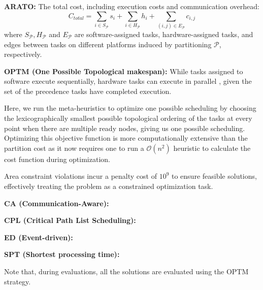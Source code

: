 \textbf{ARATO:} The total cost, including execution costs and communication overhead:
\begin{equation}
C_{total} = \sum_{i \in S_{\mathcal{P}}} s_i + \sum_{i \in H_{\mathcal{P}}} h_i + \sum_{(i,j) \in E_{\mathcal{P}}} c_{i,j}
\end{equation}
where $S_{\mathcal{P}}, H_{\mathcal{P}}$ and $E_{\mathcal{P}}$ are software-assigned tasks, hardware-assigned tasks, and edges between tasks on different platforms induced by partitioning $\mathcal{P}$, respectively.


\textbf{OPTM (One Possible Topological makespan):} While tasks assigned to software execute sequentially, hardware tasks can execute in parallel , given the set of the precedence tasks have completed execution.


Here, we run the meta-heuristics to optimize one possible scheduling by choosing the lexicographically smallest possible topological ordering of the tasks at every point when there are multiple ready nodes, giving us one possible scheduling. Optimizing this objective function is more computationally extensive than the partition cost as it now requires one to run a $\mathcal{O}(n^2)$ heuristic  to calculate the cost function during optimization.

Area constraint violations incur a penalty cost of $10^9$ to ensure feasible solutions, effectively treating the problem as a constrained optimization task. 

\textbf{CA (Communication-Aware):} 

\textbf{CPL (Critical Path List Scheduling):} 

\textbf{ED (Event-driven):} 

\textbf{SPT (Shortest processing time):} 

Note that, during evaluations, all the solutions are evaluated using the OPTM strategy.


